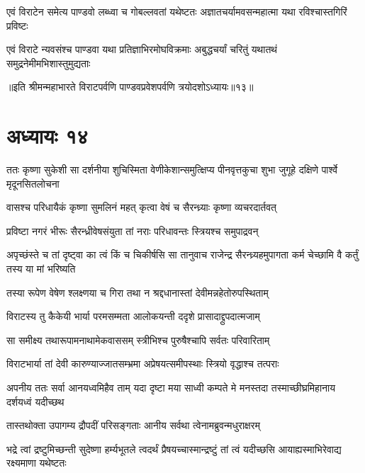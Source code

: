 
\fourlineindentedshloka
{एवं विराटेन समेत्य पाण्डवो}
{लब्ध्वा च गोबल्लवतां यथेष्टतः}
{अज्ञातचर्यामवसन्महात्मा यथा}
{रविश्चास्तगिरिं प्रविष्टः}


\fourlineindentedshloka
{एवं विराटे न्यवसंश्च पाण्डवा}
{यथा प्रतिज्ञाभिरमोघविक्रमाः}
{अबुद्धचर्यां चरितुं यथातथं}
{समुद्रनेमीमभिशास्तुमुद्यताः}

॥इति श्रीमन्महाभारते विराटपर्वणि पाण्डवप्रवेशपर्वणि त्रयोदशोऽध्यायः॥१३॥

\chapter{अध्यायः १४}

\threelineshloka
{ततः कृष्णा सुकेशी सा दर्शनीया शुचिस्मिता}
{वेणीकेशान्समुत्क्षिप्य पीनवृत्तकुचा शुभा}
{जुगूहे दक्षिणे पार्श्वे मृदूनसितलोचना}


\twolineshloka
{वासश्च परिधायैकं कृष्णा सुमलिनं महत्}
{कृत्वा वेषं च सैरन्ध्र्याः कृष्णा व्यचरदार्तवत्}


\twolineshloka
{प्रविष्टा नगरं भीरूः सैरन्ध्रीवेषसंयुता}
{तां नराः परिधावन्तः स्त्रियश्च समुपाद्रवन्}


\threelineshloka
{अपृच्छंस्ते च तां दृष्ट्वा का त्वं किं च चिकीर्षसि}
{सा तानुवाच राजेन्द्र सैरन्ध्र्यहमुपागता}
{कर्म चेच्छामि वै कर्तुं तस्य या मां भरिष्यति}



\twolineshloka
{तस्या रूपेण वेषेण श्लक्ष्णया च गिरा तथा}
{न श्रद्दधानास्तां देवीमन्नहेतोरुपस्थिताम्}


\twolineshloka
{विराटस्य तु कैकेयी भार्या परमसम्मता}
{आलोकयन्ती ददृशे प्रासादाद्द्रुपदात्मजाम्}


\twolineshloka
{सा समीक्ष्य तथारूपामनाथामेकवाससम्}
{स्त्रीभिश्च पुरुषैश्चापि सर्वतः परिवारिताम्}


\twolineshloka
{विराटभार्या तां देवी कारुण्याज्जातसम्भ्रमा}
{अप्रेषयत्समीपस्थाः स्त्रियो वृद्धाश्च तत्पराः}


\threelineshloka
{अपनीय ततः सर्वा आनयध्वमिहैव ताम्}
{यदा दृष्टा मया साध्वी कम्पते मे मनस्तदा}
{तस्माच्छीघ्रमिहानाय दर्शयध्वं यदीच्छथ}


\twolineshloka
{तास्तथोक्ता उपागम्य द्रौपदीं परिसङ्गताः}
{आनीय सर्वथा त्वेनामब्रुवन्मधुराक्षरम्}


\threelineshloka
{भद्रे त्वां द्रष्टुमिच्छन्ती सुदेष्णा हर्म्यभूतले}
{त्वदर्थं प्रैषयच्चास्मान्द्रष्टुं तां त्वं यदीच्छसि}
{आयाह्यस्माभिरेवाद्य रक्ष्यमाणा यथेष्टतः}


